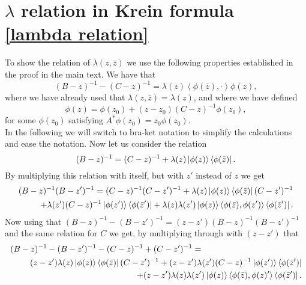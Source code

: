 \documentclass[a4paper,11pt]{article}
\renewcommand{\braket}[1]{\left\langle#1\right\rangle}
\numberwithin{equation}{section}
\begin{document}
\section{$ \lambda $ relation in Krein formula \eqref{lambda relation}}
\label{Lambda calculation}
To show the relation of $ \lambda(z,\bar{z}) $ we use the following properties established in the proof in the main text. We have that \begin{equation}\label{Krein relation 1}
(B-z)^{-1}-(C-z)^{-1}=\lambda(z)\braket{\phi(\bar{z}),\cdot}\phi(z),
\end{equation}
where we have already used that $ \lambda(z,\bar{z})=\lambda(z) $, and where we have defined \begin{equation}\label{Krein relation 2}
\phi(z)=\phi(z_0)+(z-z_0)(C-z)^{-1}\phi(z_0),
\end{equation}
for some $ \phi(z_0) $ satisfying $ A^*\phi(z_0)=z_0\phi(z_0) $. \\
In the following we will switch to bra-ket notation to simplify the calculations and ease the notation. Now let us consider the relation \begin{equation}
(B-z)^{-1}=(C-z)^{-1}+\lambda(z)\ket{\phi(z)}\bra{\phi(\bar{z})}.
\end{equation}
By multiplying this relation with itself, but with $ z' $ instead of $ z $ we get\begin{equation}
\begin{aligned}
(B-z)^{-1}(B-z')^{-1}=(C-z)^{-1}(C-z')^{-1}+\lambda(z)\ket{\phi(z)}\bra{\phi(\bar{z})}(C-z')^{-1}\\+\lambda(z')(C-z)^{-1}\ket{\phi(z')}\bra{\phi(\bar{z}')}+\lambda(z)\lambda(z')\ket{\phi(z)}\braket{\phi(\bar{z}),\phi(z')}\bra{\phi(\bar{z}')}.
\end{aligned}
\end{equation}
Now using that $ (B-z)^{-1}-(B-z')^{-1}=(z-z')(B-z)^{-1}(B-z')^{-1} $ and the same relation for $ C $ we get, by multiplying through with $ (z-z') $ that \begin{equation}
\begin{aligned}
(B-z)^{-1}-(B-z')^{-1}-(C-z)^{-1}+(C-z')^{-1}=\qquad\qquad\qquad\qquad\qquad\qquad\\(z-z')\lambda(z)\ket{\phi(z)}\bra{\phi(\bar{z})}(C-z')^{-1}+(z-z')\lambda(z')(C-z)^{-1}\ket{\phi(z')}\bra{\phi(\bar{z}')}\\+(z-z')\lambda(z)\lambda(z')\ket{\phi(z)}\braket{\phi(\bar{z}),\phi(z)'}\bra{\phi(\bar{z}')}.
\end{aligned}
\end{equation}
\end{document}
